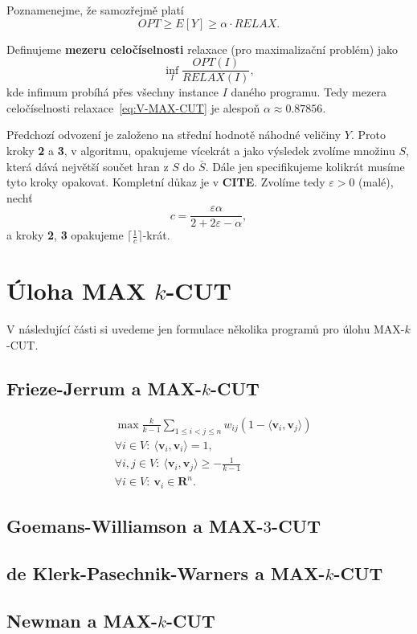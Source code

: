 Poznamenejme, že samozřejmě platí
$$
    OPT \geq E\left[ Y \right] \geq \alpha \cdot RELAX.
$$

Definujeme \textbf{mezeru celočíselnosti} relaxace (pro maximalizační problém) jako
$$
    \inf_{I} \frac{OPT(I)}{RELAX(I)},
$$
kde infimum probíhá přes všechny instance $I$ daného programu. Tedy mezera celočíselnosti relaxace~\ref{eq:V-MAX-CUT} je alespoň $\alpha \approx 0.87856$.

Předchozí odvození je založeno na střední hodnotě náhodné veličiny $Y$. Proto kroky \textbf{2} a \textbf{3}, v algoritmu, opakujeme vícekrát a jako výsledek zvolíme množinu $S$, která dává největší součet hran z $S$ do $\bar{S}$. Dále jen specifikujeme kolikrát musíme tyto kroky opakovat. Kompletní důkaz je v \textbf{CITE}. Zvolíme tedy $\varepsilon > 0$ (malé), nechť
$$
    c = \frac{\varepsilon \alpha}{2 + 2\varepsilon - \alpha},
$$
a kroky \textbf{2}, \textbf{3} opakujeme $\lceil \frac{1}{c} \rceil$-krát.


\section{Úloha MAX $k$-CUT}

V následující části si uvedeme jen formulace několika programů pro úlohu MAX-$k$-CUT.

\subsection*{Frieze-Jerrum a MAX-$k$-CUT}

\begin{equation}\tag{FJ-MAX-$k$-CUT}
    \begin{split}
        &\max \frac{k}{k-1} \sum_{1 \leq i < j \leq n} w_{ij} (1 - \langle \mathbf{v}_i, \mathbf{v}_j \rangle) \\
        &\forall i \in V:\ \langle \mathbf{v}_i, \mathbf{v}_i \rangle = 1, \\
        &\forall i,j \in V:\ \langle \mathbf{v}_i, \mathbf{v}_j \rangle \geq -\frac{1}{k-1} \\
        &\forall i \in V:\ \mathbf{v}_i \in \mathbf{R}^n.
    \end{split}
    \label{eq:FJ-MAX-k-CUT}
\end{equation}


\subsection*{Goemans-Williamson a MAX-$3$-CUT}

\subsection*{de Klerk-Pasechnik-Warners a MAX-$k$-CUT}

\subsection*{Newman a MAX-$k$-CUT}
